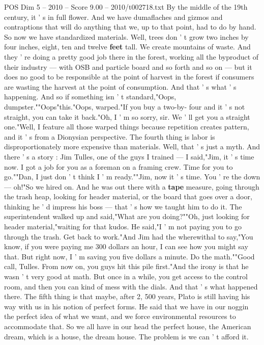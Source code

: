 \begin{textsample}{POS Dim 5 – 2010 – Score 9.00 – 2010/t002718.txt}
By the middle of the 19th century, it ' s in full flower.
And we have dumaflaches and gizmos and contraptions that will do anything that we, up to that point, had to do by hand.
So now we have standardized materials.
Well, trees don ' t grow two inches by four inches, eight, ten and twelve \textbf{feet} tall.
We create mountains of waste.
And they ' re doing a pretty good job there in the forest, working all the byproduct of their industry — with OSB and particle board and so forth and so on — but it does no good to be responsible at the point of harvest in the forest if consumers are wasting the harvest at the point of consumption.
And that ' s what ' s happening.
And so if something isn ' t standard,"Oops, dumpster.""Oops"this."Oops, warped."If you buy a two-by- four and it ' s not straight, you can take it back."Oh, I ' m so sorry, sir.
We ' ll get you a straight one."Well, I feature all those warped things because repetition creates pattern, and it ' s from a Dionysian perspective.
The fourth thing is labor is disproportionately more expensive than materials.
Well, that ' s just a myth.
And there ' s a story : Jim Tulles, one of the guys I trained — I said,"Jim, it ' s time now.
I got a job for you as a foreman on a framing crew.
Time for you to go.""Dan, I just don ' t think I ' m ready.""Jim, now it ' s time.
You ' re the down — oh!"So we hired on.
And he was out there with a \textbf{tape} measure, going through the trash heap, looking for header material, or the board that goes over a door, thinking he ' d impress his boss — that ' s how we taught him to do it.
The superintendent walked up and said,"What are you doing?""Oh, just looking for header material,"waiting for that kudos.
He said,"I ' m not paying you to go through the trash.
Get back to work."And Jim had the wherewithal to say,"You know, if you were paying me 300 dollars an hour, I can see how you might say that.
But right now, I ' m saving you five dollars a minute.
Do the math.""Good call, Tulles.
From now on, you guys hit this pile first."And the irony is that he wasn ' t very good at math.
But once in a while, you get access to the control room, and then you can kind of mess with the dials.
And that ' s what happened there.
The fifth thing is that maybe, after 2, 500 years, Plato is still having his way with us in his notion of perfect forms.
He said that we have in our noggin the perfect idea of what we want, and we force environmental resources to accommodate that.
So we all have in our head the perfect house, the American dream, which is a house, the dream house.
The problem is we can ' t afford it.

\end{textsample}

